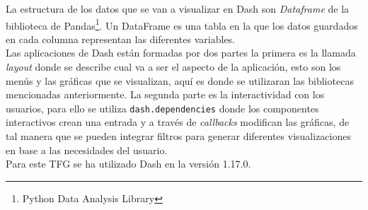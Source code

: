 La estructura de los datos que se van a visualizar en  Dash son\textit{ Dataframe} de la biblioteca de Pandas\footnote{Python Data Analysis Library}. Un DataFrame es una tabla en la que los datos guardados en cada columna representan las diferentes variables.\\

Las aplicaciones de Dash están formadas por dos partes la primera es la llamada \textit{layout} donde se describe cual va a ser el aspecto de la aplicación, esto son los menús y las gráficas que se visualizan, aquí es donde se utilizaran las bibliotecas mencionadas anteriormente. La segunda parte es la interactividad con los usuarios, para ello se utiliza \texttt{dash.dependencies} donde los componentes interactivos crean una entrada y a través de \textit{callbacks} modifican las gráficas, de tal manera que se pueden integrar filtros para generar diferentes visualizaciones en base a las necesidades del usuario.\\

Para este TFG se ha utilizado Dash en la versión 1.17.0.















